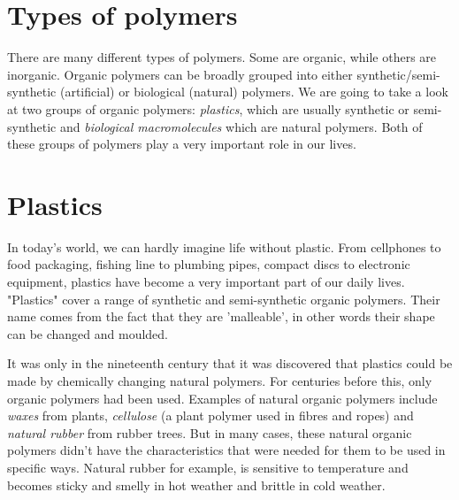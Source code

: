 
\section{Types of polymers}
\label{subsec:orgmac:types}

There are many different types of polymers. Some are organic, while others are inorganic. Organic polymers can be broadly grouped into either synthetic/semi-synthetic (artificial) or biological (natural) polymers. We are going to take a look at two groups of organic polymers: \textit{plastics}, which are usually synthetic or semi-synthetic and \textit{biological macromolecules} which are natural polymers. Both of these groups of polymers play a very important role in our lives.






\section{Plastics}
\label{sec:orgmac:plastics}

In today's world, we can hardly imagine life without plastic. From cellphones to food packaging, fishing line to plumbing pipes, compact discs to electronic equipment, plastics have become a very important part of our daily lives. "Plastics" cover a range of synthetic and semi-synthetic organic polymers. Their name comes from the fact that they are 'malleable', in other words their shape can be changed and moulded. 


It was only in the nineteenth century that it was discovered that plastics could be made by chemically changing natural polymers. For centuries before this, only  organic polymers had been used. Examples of natural organic polymers include \textit{waxes} from plants, \textit{cellulose} (a plant polymer used in fibres and ropes) and \textit{natural rubber} from rubber trees. But in many cases, these natural organic polymers didn't have the characteristics that were needed for them to be used in specific ways. Natural rubber for example, is sensitive to temperature and becomes sticky and smelly in hot weather and brittle in cold weather. \\

